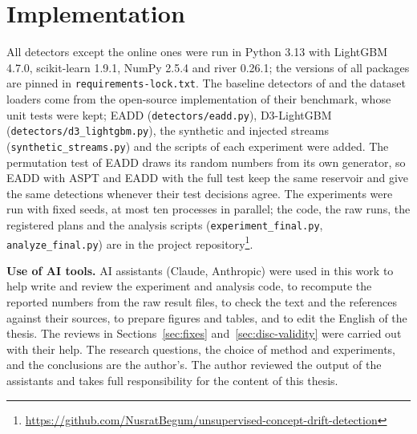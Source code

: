 \section{Implementation}
\label{sec:implementation}
All detectors except the online ones were run in Python 3.13 with LightGBM 4.7.0, scikit-learn 1.9.1, NumPy 2.5.4 and river 0.26.1; the versions of all packages are pinned in \texttt{requirements-lock.txt}. The baseline detectors of \citet{Lukats2024} and the dataset loaders come from the open-source implementation of their benchmark, whose unit tests were kept; EADD (\texttt{detectors/eadd.py}), D3-LightGBM (\nolinkurl{detectors/d3_lightgbm.py}), the synthetic and injected streams (\nolinkurl{synthetic_streams.py}) and the scripts of each experiment were added. The permutation test of EADD draws its random numbers from its own generator, so EADD with ASPT and EADD with the full test keep the same reservoir and give the same detections whenever their test decisions agree. The experiments were run with fixed seeds, at most ten processes in parallel; the code, the raw runs, the registered plans and the analysis scripts (\nolinkurl{experiment_final.py}, \nolinkurl{analyze_final.py}) are in the project repository\footnote{\url{https://github.com/NusratBegum/unsupervised-concept-drift-detection}}.

\textbf{Use of AI tools.} AI assistants (Claude, Anthropic) were used in this work to help write and review the experiment and analysis code, to recompute the reported numbers from the raw result files, to check the text and the references against their sources, to prepare figures and tables, and to edit the English of the thesis. The reviews in Sections~\ref{sec:fixes} and~\ref{sec:disc-validity} were carried out with their help. The research questions, the choice of method and experiments, and the conclusions are the author's. The author reviewed the output of the assistants and takes full responsibility for the content of this thesis.
